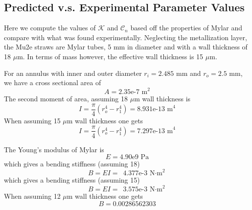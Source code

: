 \documentclass[twoside]{article}
\begin{document}
\begin{multicols}{2}
\section{Predicted v.s. Experimental Parameter Values}
\label{sec:prop}
Here we compute the values of $\mathcal{K}$ and $\mathcal{C}_n$ based off the properties of Mylar and compare with what was found experimentally. 
Neglecting the metallization layer, the Mu2e straws are Mylar tubes, 5 mm in diameter and with a wall thickness of 18 $\mu$m.  In terms of mass however, the effective wall thickness is 15 $\mu$m.

For an annulus with inner and outer diameter $r_i = 2.485 \text{ mm}$ and $r_o = 2.5 \text{ mm}$, we have  a cross sectional area of
\begin{equation}
A =  \text{2.35e-7 m}^2
\end{equation}
The second moment of area, assuming 18 $\mu$m wall thickness is
\begin{equation}
I = \frac{\pi}{4}(r^4_o - r^4_1) = \text{8.931e-13 m}^4
\end{equation}
When assuming 15 $\mu$m wall thickness one gets
\begin{equation}
I = \frac{\pi}{4}(r^4_o - r^4_1) = \text{7.297e-13 m}^4
\end{equation}




The Young's modulus of Mylar is 
\begin{equation}
	E = \text{4.90e9 Pa}
\end{equation}
which gives a bending stiffness (assuming 18)
\begin{equation}
B = EI = \text{  4.377e-3  N$\cdot$m}^2
\label{eq:b}
\end{equation}
which gives a bending stiffness (assuming 15)
\begin{equation}
B = EI = \text{  3.575e-3  N$\cdot$m}^2
\end{equation}
When assuming 12 $\mu$m wall thickness one gets
\begin{equation}
B = 0.00286562303
\end{equation}



\end{multicols}
\end{document}
